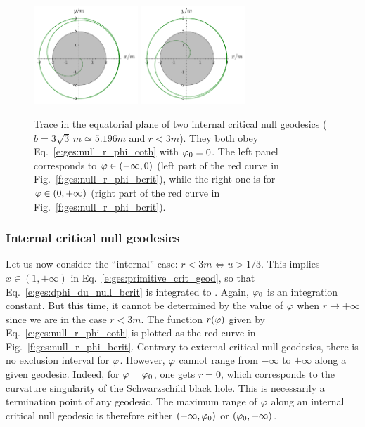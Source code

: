 \begin{figure}
\centerline{
\includegraphics[width=0.35\textwidth]{ges_null_b_crit_intern_1.pdf}\qquad
\includegraphics[width=0.35\textwidth]{ges_null_b_crit_intern_2.pdf}
}
\caption[]{\label{f:ges:null_b_crit_intern} \footnotesize
Trace in the equatorial plane of two internal critical null geodesics ($b = 3\sqrt{3} \, m \simeq 5.196 m$ and
$r<3m$). They both obey Eq.~\eqref{e:ges:null_r_phi_coth} with $\varphi_0 = 0$.
The left panel corresponds to $\varphi\in (-\infty, 0)$ (left part of the red curve
in Fig.~\ref{f:ges:null_r_phi_bcrit}), while the right one is
for $\varphi\in (0, +\infty)$ (right part of the red curve
in Fig.~\ref{f:ges:null_r_phi_bcrit}).}
\end{figure}


\subsubsection{Internal critical null geodesics}

Let us now consider the ``internal'' case: $r< 3m \iff u>1/3$.
This implies $x\in (1,+\infty)$ in Eq.~\eqref{e:ges:primitive_crit_geod},
so that Eq.~\eqref{e:ges:dphi_du_null_bcrit} is integrated to
\be \label{e:ges:null_r_phi_coth}
    .
\ee
Again, $\varphi_0$ is an integration constant. But this time, it cannot be determined by the
value of $\varphi$ when $r\to +\infty$ since we are in the case $r<3m$.
The function $r(\varphi)$ given by Eq.~\eqref{e:ges:null_r_phi_coth} is plotted as the red
curve in Fig.~\ref{f:ges:null_r_phi_bcrit}. Contrary to external critical null geodesics, there
is no exclusion interval for $\varphi$. However, $\varphi$ cannot range from $-\infty$
to $+\infty$ along a given geodesic. Indeed, for $\varphi=\varphi_0$, one gets
$r=0$, which corresponds to the curvature singularity of the Schwarzschild black hole.
This is necessarily a termination point of any geodesic. The maximum
range of $\varphi$ along an internal critical null geodesic is therefore
either $(-\infty,\varphi_0)$ or $(\varphi_0,+\infty)$.

